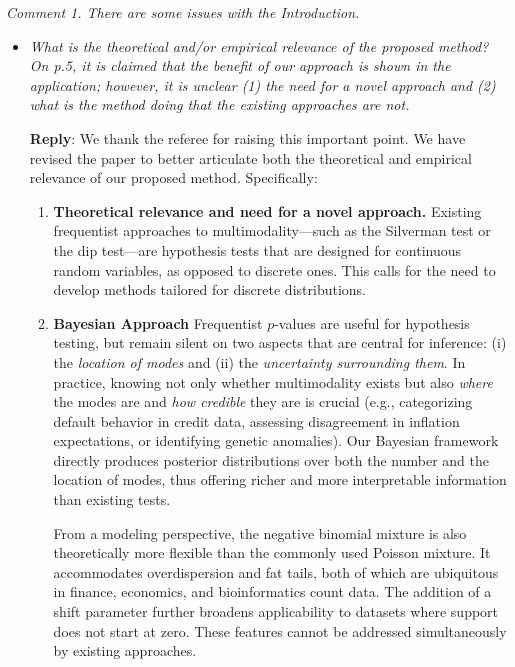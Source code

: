 \documentclass[12pt]{article}
\begin{document}
\textit{Comment 1. There are some issues with the Introduction.}
\begin{itemize}
\item[a] \textit{What is the theoretical and/or empirical relevance of the proposed method? On p.5, it
is claimed that the benefit of our approach is shown in the application; however, it is
unclear (1) the need for a novel approach and (2) what is the method doing that the
existing approaches are not.}

\textbf{Reply}: We thank the referee for raising this important point. We have revised the paper to better articulate both the theoretical and empirical relevance of our proposed method. Specifically:
\begin{enumerate}
	\item \textbf{Theoretical relevance and need for a novel approach.} 
	Existing frequentist approaches to multimodality---such as the Silverman test or the dip test---are hypothesis tests that are designed for continuous random variables, as opposed to discrete ones. This calls for the need to develop methods tailored for discrete distributions.
	
	\item \textbf{Bayesian Approach}
	Frequentist $p$-values are useful for hypothesis testing, but remain silent on two aspects that are central for inference: (i) the \emph{location of modes} and (ii) the \emph{uncertainty surrounding them}. In practice, knowing not only whether multimodality exists but also \emph{where} the modes are and \emph{how credible} they are is crucial (e.g., categorizing default behavior in credit data, assessing disagreement in inflation expectations, or identifying genetic anomalies). Our Bayesian framework directly produces posterior distributions over both the number and the location of modes, thus offering richer and more interpretable information than existing tests.
	
	From a modeling perspective, the negative binomial mixture is also theoretically more flexible than the commonly used Poisson mixture. It accommodates overdispersion and fat tails, both of which are ubiquitous in finance, economics, and bioinformatics count data. The addition of a shift parameter further broadens applicability to datasets where support does not start at zero. These features cannot be addressed simultaneously by existing approaches.
	

\end{enumerate}
\end{itemize}
\end{document}
